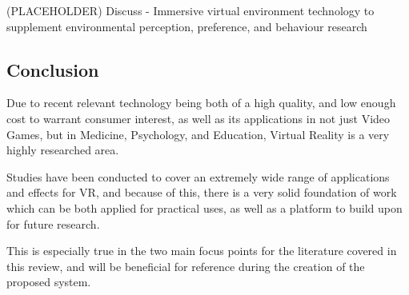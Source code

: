 
		(PLACEHOLDER) Discuss \cite{smith2015} - Immersive virtual environment technology to supplement environmental perception, preference, and behaviour research

	\subsection{Conclusion}
	\label{lr:vr:conclusion}
		Due to recent relevant technology being both of a high quality, and low enough cost to warrant consumer interest, as well as its applications in not just Video Games, but in Medicine, Psychology, and Education, Virtual Reality is a very highly researched area.

		Studies have been conducted to cover an extremely wide range of applications and effects for VR, and because of this, there is a very solid foundation of work which can be both applied for practical uses, as well as a platform to build upon for future research.

		This is especially true in the two main focus points for the literature covered in this review, and will be beneficial for reference during the creation of the proposed system.

